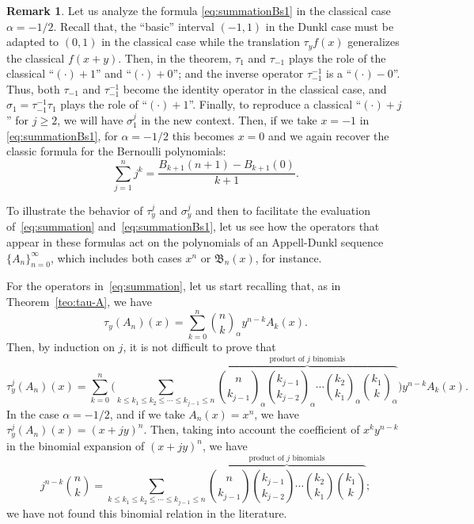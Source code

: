 \documentclass[10pt]{article}
\theoremstyle{plain}
\theoremstyle{definition}
\newtheorem{remark}{Remark}
\numberwithin{equation}{section} %
\newcommand{\binoma}[2]{\binom{#1}{#2}_{\!\alpha}}
\newcommand{\B}{\mathfrak{B}}
\begin{document}
\begin{remark}
\label{rem:sigma1}
Let us analyze the formula \eqref{eq:summationBs1} in the classical case $\alpha=-1/2$. 
Recall that, the ``basic'' interval $(-1,1)$ in the Dunkl case must be adapted to $(0,1)$ in the classical case while the translation $\tau_y f(x)$ generalizes the classical $f(x+y)$. Then, in the theorem, $\tau_1$ and $\tau_{-1}$ plays the role of the classical ``$(\cdot)+1$'' and ``$(\cdot)+0$''; and the inverse operator $\tau_{-1}^{-1}$ is a ``$(\cdot)-0$''. Thus, both $\tau_{-1}$ and $\tau_{-1}^{-1}$ become the identity operator in the classical case, and $\sigma_1 = \tau_{-1}^{-1}\tau_1$ plays the role of ``$(\cdot)+1$''. Finally, to reproduce a classical ``$(\cdot)+j$'' for $j \ge 2$, we will have $\sigma_1^{j}$ in the new context.
Then, if we take $x=-1$ in \eqref{eq:summationBs1}, for $\alpha=-1/2$ this becomes $x=0$ and we again recover the classic formula for the Bernoulli polynomials:
\[
  \sum_{j=1}^n j^k = \frac{B_{k+1}(n+1) - B_{k+1}(0)}{k+1}.
\]
\end{remark}


To illustrate the behavior of $\tau_y^j$ and $\sigma_y^j$ and then to facilitate the evaluation of~\eqref{eq:summation} and~\eqref{eq:summationBs1}, let us see how the operators that appear in these formulas act on the polynomials of an Appell-Dunkl sequence $\{A_n\}_{n=0}^\infty$, which includes both cases $x^n$ or $\B_n(x)$, for instance.

For the operators in~\eqref{eq:summation}, let us start recalling that, as in Theorem~\ref{teo:tau-A}, we have
\[
  \tau_y(A_n)(x)
  = \sum_{k=0}^n \binoma{n}{k} y^{n-k} A_k(x).
\]
Then, by induction on $j$, it is not difficult to prove that
\[
  \tau_y^j(A_n)(x)
  = \sum_{k=0}^n \Bigg( \sum_{k \le k_1 \le k_2 \le \cdots \le k_{j-1} \le n} 
  \overbrace{\binoma{n}{k_{j-1}} \binoma{k_{j-1}}{k_{j-2}} \cdots \binoma{k_2}{k_1} 
  \binoma{k_1}{k}}^{\text{product of $j$ binomials}} \Bigg) y^{n-k} A_k(x).
\]
In the case $\alpha=-1/2$, and if we take $A_n(x) = x^n$, we have $\tau_y^j(A_n)(x) = (x+jy)^n$.
Then, taking into account the coefficient of $x^k y^{n-k}$ in the binomial expansion of $(x+jy)^n$, we have
\[
  j^{n-k} \binom{n}{k} = \sum_{k \le k_1 \le k_2 \le \cdots \le k_{j-1} \le n} 
  \overbrace{\binom{n}{k_{j-1}} \binom{k_{j-1}}{k_{j-2}} \cdots \binom{k_2}{k_1} 
  \binom{k_1}{k}}^{\text{product of $j$ binomials}};
\]
we have not found this binomial relation in the literature.
\end{document}
